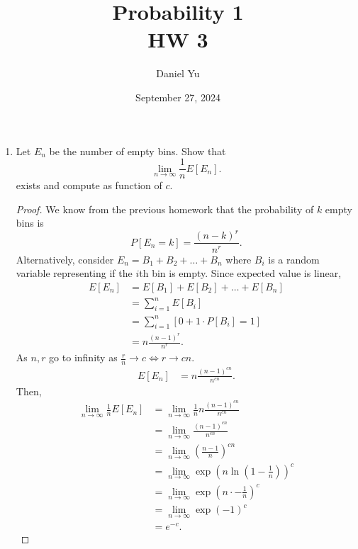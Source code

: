 \documentclass[a4paper]{article}
\title{\Huge{Probability 1}\\HW 3}
\author{\huge{Daniel Yu}}
\date{September 27, 2024}
\begin{document}
\maketitle
\newpage%
\pagebreak

\begin{enumerate}
  \item Let $E_n$ be the number of empty bins. Show that  
    \[
      \lim_{n \to \infty} \frac{1}{n} E[E_n]
    .\] exists and compute as function of $c$.
    \begin{proof}
      We know from the previous homework that the probability of $k$ empty bins is 
       \[
         P[E_n = k] = \frac{(n-k)^{r}}{n^{r}}
      .\] 
      Alternatively, consider $E_n = B_1 + B_2 + \ldots + B_n$ where $B_i$ is a random variable representing if the  $i$th bin is empty. Since expected value is linear, 
      \begin{align*}
        E[E_n] &= E[B_1] + E[B_2] + \ldots + E[B_n] \\
               &= \sum_{i=1}^{n} E[B_i] \\
               &= \sum_{i=1}^{n} [0 + 1 \cdot P[B_i]=1 ] \\
               &= n \frac{(n-1)^{r}}{n^{r}}
      .\end{align*}
      As $n, r$ go to infinity as  $\frac{r}{n} \to c \iff r \to cn$. 
      \begin{align*}
        E[E_n] &= n \frac{(n-1)^{cn}}{n^{cn}}
      .\end{align*}
      Then,
      \begin{align*}
        \lim_{n \to \infty} \frac{1}{n} E[E_n] &= \lim_{n \to \infty} \frac{1}{n} n \frac{(n-1)^{cn}}{n^{cn}} \\
                                               &= \lim_{n \to \infty} \frac{(n-1)^{cn}}{n^{cn}}\\
                                               &= \lim_{n \to \infty} (\frac{n-1}{n})^{cn} \\
                                               &= \lim_{n \to \infty} \exp(n \ln(1 - \frac{1}{n}))^{c} \\
                                               &= \lim_{n \to \infty} \exp(n \cdot -\frac{1}{n})^{c} \\
                                               &= \lim_{n \to \infty} \exp(-1)^{c} \\
                                               &= e^{-c}
      .\end{align*} 

\end{proof}
\end{enumerate}
\end{document}
